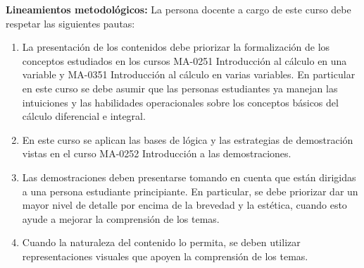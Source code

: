 \begin{refsection}
\noindent \textbf{Lineamientos metodológicos:} La persona docente a cargo de este curso debe respetar las siguientes pautas:
\begin{enumerate}
    \item La presentación de los contenidos debe priorizar la formalización de los conceptos estudiados en los cursos MA-0251 Introducción al cálculo en una variable y MA-0351 Introducción al cálculo en varias variables. En particular en este curso se debe asumir que las personas estudiantes  ya manejan las intuiciones y las habilidades operacionales sobre los conceptos básicos del cálculo diferencial e integral.
    \item En este curso se aplican las bases de lógica y las estrategias de demostración vistas en el curso MA-0252 Introducción a las demostraciones.
    \item Las demostraciones deben presentarse tomando en cuenta que están dirigidas a una persona estudiante principiante. En particular, se debe priorizar dar un mayor nivel de detalle por encima de la brevedad y la estética, cuando esto ayude a mejorar la comprensión de los temas.
    \item Cuando la naturaleza del contenido lo permita, se deben utilizar representaciones visuales que apoyen la comprensión de los temas.
\end{enumerate}


\end{refsection}
